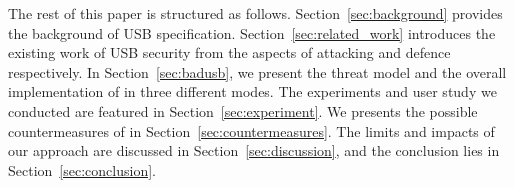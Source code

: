 The rest of this paper is structured as follows.
Section~\ref{sec:background} provides the background of USB specification.
Section~\ref{sec:related_work} introduces the existing work of USB security from the aspects of attacking and defence respectively.
In Section~\ref{sec:badusb}, we present the threat model and the overall implementation of \tool in three different modes.
The experiments and user study we conducted are featured in Section~\ref{sec:experiment}.
We presents the possible countermeasures of \tool in Section~\ref{sec:countermeasures}.
The limits and impacts of our approach are discussed in Section~\ref{sec:discussion}, and the conclusion lies in Section~\ref{sec:conclusion}.














